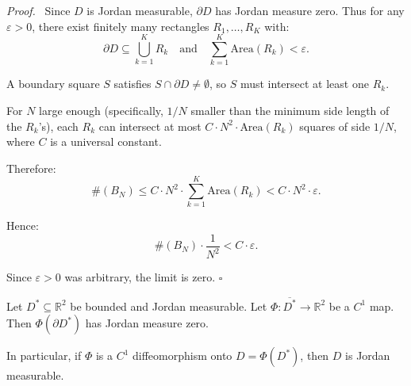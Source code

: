 \documentclass[11pt]{report}
\renewenvironment{proof}[1][Proof]{\par\noindent\textit{#1.}\ }{\hfill$\square$\par\medskip}
\newcommand{\R}{\mathbb{R}}
\begin{document}
\begin{proof}
Since $D$ is Jordan measurable, $\partial D$ has Jordan measure zero. Thus for any $\varepsilon > 0$, there exist finitely many rectangles $R_1, \ldots, R_K$ with:
\[
\partial D \subseteq \bigcup_{k=1}^K R_k \quad \text{and} \quad \sum_{k=1}^K \text{Area}(R_k) < \varepsilon.
\]

A boundary square $S$ satisfies $S \cap \partial D \neq \emptyset$, so $S$ must intersect at least one $R_k$.

For $N$ large enough (specifically, $1/N$ smaller than the minimum side length of the $R_k$'s), each $R_k$ can intersect at most $C \cdot N^2 \cdot \text{Area}(R_k)$ squares of side $1/N$, where $C$ is a universal constant.

Therefore:
\[
\#(B_N) \leq C \cdot N^2 \cdot \sum_{k=1}^K \text{Area}(R_k) < C \cdot N^2 \cdot \varepsilon.
\]

Hence:
\[
\#(B_N) \cdot \frac{1}{N^2} < C \cdot \varepsilon.
\]

Since $\varepsilon > 0$ was arbitrary, the limit is zero.
\end{proof}

\begin{proposition}
\label{prop:diffeo-jordan}
Let $D^* \subseteq \R^2$ be bounded and Jordan measurable. Let $\Phi: \overline{D^*} \to \R^2$ be a $C^1$ map. Then $\Phi(\partial D^*)$ has Jordan measure zero.

In particular, if $\Phi$ is a $C^1$ diffeomorphism onto $D = \Phi(D^*)$, then $D$ is Jordan measurable.
\end{proposition}
\end{document}
